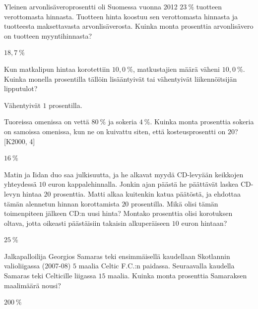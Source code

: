 \begin{tehtavasivu}
\begin{tehtava}
    Yleinen arvonlisäveroprosentti oli Suomessa vuonna 2012 $23~\%$ tuotteen
    verottomasta hinnasta. Tuotteen hinta koostuu sen verottomasta hinnasta 
    ja tuotteesta maksettavasta arvonlisäverosta. Kuinka monta 
    prosenttia arvonlisävero on tuotteen myyntihinnasta?
    \begin{vastaus}
        $18,7~\%$
    \end{vastaus}
\end{tehtava}

\begin{tehtava}
    Kun matkalipun hintaa korotettiin $10,0~\%$, matkustajien määrä väheni $10,0~\%$.
    Kuinka monella prosentilla tällöin lisääntyivät tai vähentyivät liikennöitsijän 
    lipputulot?
    \begin{vastaus}
        Vähentyivät $1$ prosentilla.
    \end{vastaus}
\end{tehtava}

\begin{tehtava}
    Tuoreissa omenissa on vettä $80~\%$ ja sokeria $4~\%$. Kuinka monta prosenttia sokeria
    on samoissa omenissa, kun ne on kuivattu siten, että kosteusprosentti on $20$? [K2000, 4]
    \begin{vastaus}
        $16~\%$
    \end{vastaus}
\end{tehtava}

\begin{tehtava}
    Matin ja Iidan duo saa julkisuutta, ja he alkavat myydä CD-levyään keikkojen yhteydessä $10$ euron
    kappalehinnalla. Jonkin ajan päästä he päättävät laskea CD-levyn hintaa $20$ prosenttia. Matti alkaa
    kuitenkin katua päätöstä, ja ehdottaa tämän alennetun hinnan korottamista $20$ prosentilla. Mikä olisi
    tämän toimenpiteen jälkeen CD:n uusi hinta? Montako prosenttia olisi korotuksen oltava, jotta oikeasti
    päästäisiin takaisin alkuperäiseen $10$ euron hintaan?
    \begin{vastaus}
        $25~\%$
    \end{vastaus}
\end{tehtava}

\begin{tehtava}
    Jalkapalloilija Georgios Samaras teki ensimmäisellä kaudellaan Skotlannin valioliigassa (2007-08)
    $5$ maalia Celtic F.C.:n paidassa. Seuraavalla kaudella Samaras teki Celticille liigassa $15$ maalia.
    Kuinka monta prosenttia Samaraksen maalimäärä nousi?
    \begin{vastaus}
        $200~\%$
    \end{vastaus}
\end{tehtava}


\end{tehtavasivu}
